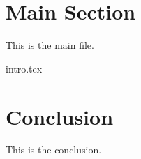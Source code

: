 \documentclass{article}
\begin{document}
\section{Main Section}

This is the main file.

{intro.tex}

\section{Conclusion}

This is the conclusion.
\end{document}
